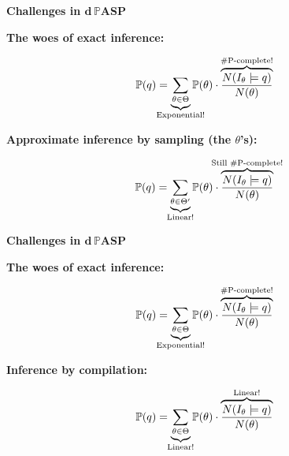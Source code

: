 \documentclass[aspectratio=169]{beamer}
\newcommand{\dpaspnc}{\textbf{$\bm{d}$\,$\pmb{\mathbb{P}}$ASP}}
\begin{document}
\begin{frame}[fragile]{\textbf{Challenges in \dpaspnc}}
\footnotesize

{\bfseries\color{palette-orange}The woes of exact inference:}

\begin{equation*}
  \mathbb{P}(q)=\underbrace{\sum_{\theta\in\Theta}}_{\mathclap{\text{Exponential!}}}\mathbb{P}(\theta)\cdot\overbrace{\frac{N(I_\theta\models q)}{N(\theta)}}^{\mathclap{\text{\#P-complete!}}}
\end{equation*}

\vspace{0.5cm}

{\bfseries\color{palette-orange}Approximate inference by sampling (the $\theta$'s):}

\begin{equation*}
  \mathbb{P}(q)=\underbrace{\sum_{\theta\in\Theta'}}_{\mathclap{\text{Linear!}}}\mathbb{P}(\theta)\cdot\overbrace{\frac{N(I_\theta\models q)}{N(\theta)}}^{\mathclap{\text{Still \#P-complete!}}}
\end{equation*}

\end{frame}


\begin{frame}[fragile]{\textbf{Challenges in \dpaspnc}}
\footnotesize

{\bfseries\color{palette-orange}The woes of exact inference:}

\begin{equation*}
  \mathbb{P}(q)=\underbrace{\sum_{\theta\in\Theta}}_{\mathclap{\text{Exponential!}}}\mathbb{P}(\theta)\cdot\overbrace{\frac{N(I_\theta\models q)}{N(\theta)}}^{\mathclap{\text{\#P-complete!}}}
\end{equation*}

\vspace{0.5cm}

{\bfseries\color{palette-orange}Inference by compilation:}

\begin{equation*}
  \mathbb{P}(q)=\underbrace{\sum_{\theta\in\Theta}}_{\mathclap{\text{Linear!}}}\mathbb{P}(\theta)\cdot\overbrace{\frac{N(I_\theta\models q)}{N(\theta)}}^{\mathclap{\text{Linear!}}}
\end{equation*}

\end{frame}
\end{document}

